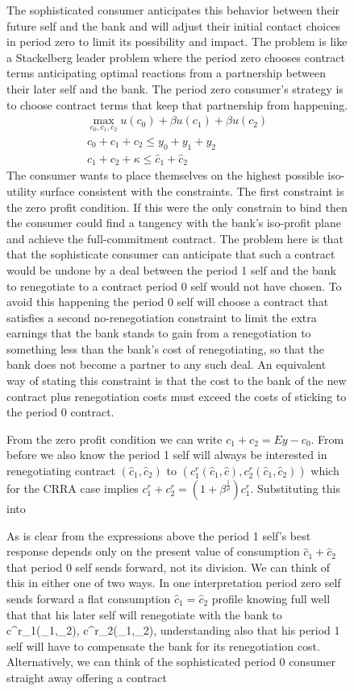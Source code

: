 \documentclass[11pt]{article}%
\begin{document}
\begin{figure}
{The sophisticated consumer anticipates this behavior between their future self and the bank and will adjust their initial contact choices in period zero to limit its possibility and impact.  The problem is like a Stackelberg leader problem where the period zero chooses contract terms anticipating  optimal reactions from a partnership between their later self and the bank.  The period zero consumer's strategy is to choose contract terms that keep that partnership from happening.
\begin{align*}
\max_{c_{0}, c_{1}, c_{2}} u(c_0)+\beta u(c_{1})+\beta u(c_{2})\\
c_0+c_1+ c_2 \leq y_0+y_1+ y_2\\
c_{1}+ c_{2}      +\kappa\leq \widehat{c}_{1}+\widehat{c}_{2}
\end{align*}
The consumer wants to place themselves on the highest possible iso-utility surface consistent with the constraints. The first constraint is the zero profit condition. If this were the only constrain to bind then the consumer could find a tangency with the bank's iso-profit plane and achieve the full-commitment contract.  The problem here is that that the sophisticate consumer can anticipate that such a contract would be undone by a deal between the period 1 self and the bank to renegotiate to a contract period 0 self would not have chosen.    To avoid this happening the period 0 self will choose a contract that satisfies a second  no-renegotiation constraint to limit the extra earnings  that the bank stands to gain from a renegotiation to something less than the bank's cost of renegotiating, so that the bank does not become a partner to any such deal. An equivalent way of stating this constraint is that the cost to the bank of the new contract
plus renegotiation costs must exceed the costs of sticking to the period 0 contract. 
  

From the zero profit condition we can write \(c_{1 }+c_2=Ey-c_0\).  From before we also know the period 1 self will always be interested in renegotiating  contract
 \((\widehat{c}_1,\widehat{c}_2) \) to
\((c^{r}_1(\widehat{c}_1,\widehat{c}),c^{r}_2(\widehat{c}_1,\widehat{c}_{2})) \) which for the CRRA case implies \(c^{r}_1 +c^{r}_2=(1+\beta^\frac{1}{\rho})c^{r}_1 \). Substituting this into

As is clear from the expressions above the period 1 self's best response depends only on the present value of consumption   \(\widehat{c}_{1}+\widehat{c}_{2}\) that period 0 self sends forward, not its division. We
can think of this in either one of two ways.  In one interpretation period zero self sends forward a flat consumption \(\widehat{c}_{1}=\widehat{c}_{2}\) profile knowing full well that that his later self will renegotiate with the bank to c^{r}_{1}(_1,_2),  c^{r}_{2}(_1,_2)\), understanding also that his period 1 self will have to compensate the bank for its renegotiation cost. Alternatively, we can think of the sophisticated period 0 consumer straight away offering a contract 
}
\end{figure}
\end{document}
